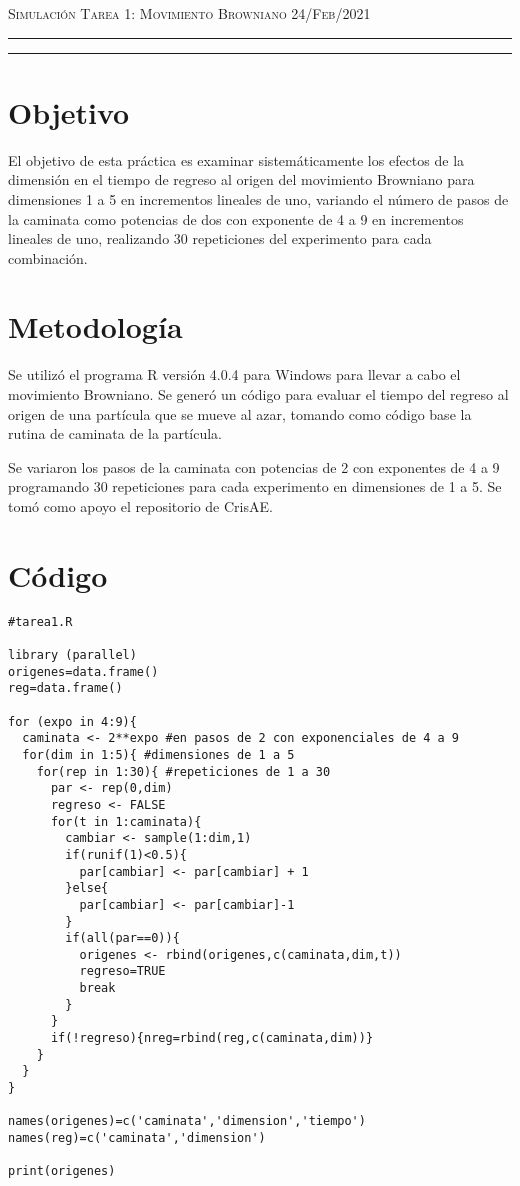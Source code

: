 \documentclass[12pt]{amsart}
\begin{document}
\thispagestyle{empty}

{\scshape Simulación} \hfill {\scshape \Large Tarea 1: Movimiento Browniano} \hfill {\scshape 24/Feb/2021}
\author{C. María Montemayor Palos}
\maketitle

\hrule
\hrule
\bigskip

\bigskip

\section{Objetivo}
El objetivo de esta práctica es examinar sistemáticamente los efectos de la dimensión en el tiempo de regreso al origen del movimiento Browniano para dimensiones 1 a 5 en incrementos lineales de uno, variando el número de pasos de la caminata como potencias de dos con exponente de 4 a 9 en incrementos lineales de uno, realizando 30 repeticiones del experimento para cada combinación.

\section{Metodología}
Se utilizó el programa R versión 4.0.4 \cite{R} para Windows para llevar a cabo el movimiento Browniano. Se generó un código para evaluar el tiempo del regreso al origen de una partícula que se mueve al azar, tomando como código base la rutina de caminata \cite{Dra.Elisa} de la partícula.

Se variaron los pasos de la caminata con potencias de 2 con exponentes de 4 a 9 programando 30 repeticiones para cada experimento en dimensiones de 1 a 5. Se tomó como apoyo el repositorio de CrisAE. \cite{CrisAE}

\section{Código}
\begin{lstlisting}
#tarea1.R

library (parallel)
origenes=data.frame()
reg=data.frame()

for (expo in 4:9){
  caminata <- 2**expo #en pasos de 2 con exponenciales de 4 a 9
  for(dim in 1:5){ #dimensiones de 1 a 5
    for(rep in 1:30){ #repeticiones de 1 a 30
      par <- rep(0,dim)
      regreso <- FALSE
      for(t in 1:caminata){
        cambiar <- sample(1:dim,1)
        if(runif(1)<0.5){
          par[cambiar] <- par[cambiar] + 1
        }else{
          par[cambiar] <- par[cambiar]-1
        }
        if(all(par==0)){
          origenes <- rbind(origenes,c(caminata,dim,t))
          regreso=TRUE
          break
        }
      }
      if(!regreso){nreg=rbind(reg,c(caminata,dim))}
    }
  }
}

names(origenes)=c('caminata','dimension','tiempo')
names(reg)=c('caminata','dimension')

print(origenes)

\end{lstlisting}
\end{document}
